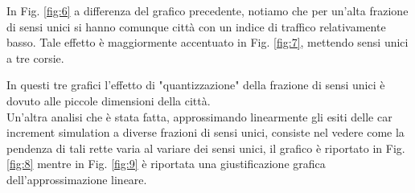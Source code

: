 \documentclass[main.tex]{subfiles}
\begin{document}
        In Fig. \ref{fig:6} a differenza del grafico precedente, notiamo che per un'alta frazione di sensi unici si hanno comunque città
        con un indice di traffico relativamente basso.
        Tale effetto è maggiormente accentuato in Fig. \ref{fig:7}, mettendo sensi unici a tre corsie.

        In questi tre grafici l'effetto di "quantizzazione" della frazione di sensi unici è dovuto alle piccole dimensioni della città.\\

        Un'altra analisi che è stata fatta, approssimando linearmente gli esiti delle car increment simulation a diverse frazioni di sensi unici, consiste nel vedere
        come la pendenza di tali rette varia al variare dei sensi unici, il grafico è riportato in Fig. \ref{fig:8} mentre in Fig. \ref{fig:9} è riportata 
        una giustificazione grafica dell'approssimazione lineare.
\end{document}
